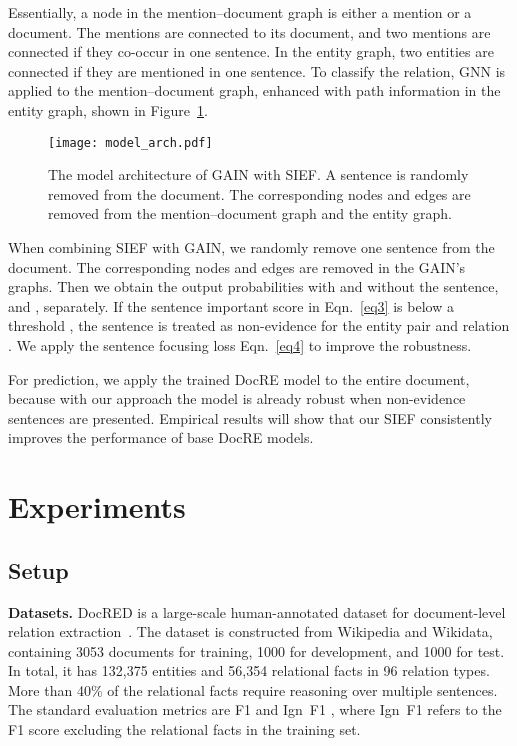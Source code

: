 \documentclass[11pt]{article}
\begin{document}
Essentially, a node in the mention--document graph is either a mention or a document. The mentions are connected to its document, and two mentions are connected if they co-occur in one sentence. In the entity graph, two entities are connected if they are mentioned in one sentence. To classify the relation, GNN is applied to the mention--document graph, enhanced with path information in the entity graph, shown in Figure~\ref{fig3:model_arch}.

\begin{figure}[!t]
  \centering
  \texttt{[image: model\_arch.pdf]}\vspace{-.2cm}
  \caption{The model architecture of GAIN with SIEF. A sentence is randomly removed from the document. The corresponding nodes and edges are removed from the mention--document graph and the entity graph.}\vspace{-.2cm}
  \label{fig3:model_arch}
\end{figure}

When combining SIEF with GAIN, we randomly remove one sentence from the document. The corresponding nodes and edges are removed in the GAIN's graphs.
Then we obtain the output probabilities with and without the sentence,  and , separately.
If the sentence important score  in Eqn.~\eqref{eq3} is below a threshold , the sentence is treated as non-evidence for the entity pair  and relation . We apply the sentence focusing loss Eqn.~\eqref{eq4} to improve the robustness.

For prediction, we apply the trained DocRE model to the entire document, because with our approach the model is already robust when non-evidence sentences are presented. Empirical results will show that our SIEF consistently improves the performance of base DocRE models. 

\section{Experiments}
\label{sec5}
\subsection{Setup}
\label{sec5-1}
\noindent \textbf{Datasets.} DocRED is a large-scale human-annotated dataset for document-level relation extraction~\cite{yao-etal-2019-docred}.
The dataset is constructed from Wikipedia and Wikidata, containing 3053 documents for training, 1000 for development, and 1000 for test. In total, it has 132,375 entities and 56,354 relational facts in 96 relation types. 
More than 40\% of the relational facts require reasoning over multiple sentences.
The standard evaluation metrics are F1 and Ign~F1 \cite{yao-etal-2019-docred,zeng-etal-2020-double}, where Ign~F1 refers to the F1 score excluding the relational facts in the training set.
\end{document}

